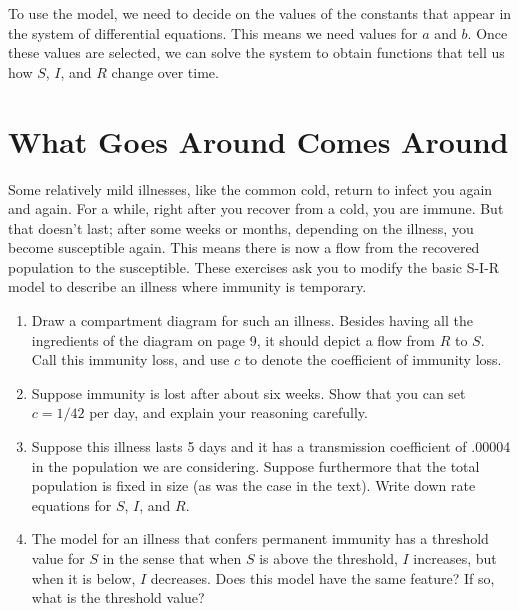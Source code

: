 \documentclass
[justified,nohyper]
{tufte-handout}
\begin{document}
To use the model, we need to decide on the values of the constants that appear
in the system of differential equations. This means we need values for $a$ and
$b$. Once these values are selected, we can solve the system to obtain functions
that tell us how $S$, $I$, and $R$ change over time.

\section{What Goes Around Comes Around}
Some relatively mild illnesses, like the common cold, return to infect you again and again. For a while, right after you recover from a cold, you are immune. But that doesn't last; after some weeks or months, depending on the illness, you become susceptible again. This means there is now a flow from the recovered population to the susceptible. These exercises ask you to modify the basic S-I-R model to describe an illness where immunity is temporary.

\begin{enumerate}
	\item Draw a compartment diagram for such an illness. Besides having all the ingredients of the diagram on page 9, it should depict a flow from $R$ to $S$. Call this immunity loss, and use $c$ to denote the coefficient of immunity loss.
	\item Suppose immunity is lost after about six weeks. Show that you can set $c = 1/42$ per day, and explain your reasoning carefully.
	\item Suppose this illness lasts 5 days and it has a transmission coefficient of .00004 in the population we are considering. Suppose furthermore that the total population is fixed in size (as was the case in the text). Write down rate equations for $S$, $I$, and $R$.
	\item The model for an illness that confers permanent immunity has a threshold value for $S$ in the sense that when $S$ is above the threshold, $I$ increases, but when it is below, $I$ decreases. Does this model have the same feature? If so, what is the threshold value?
\end{enumerate}
\end{document}
